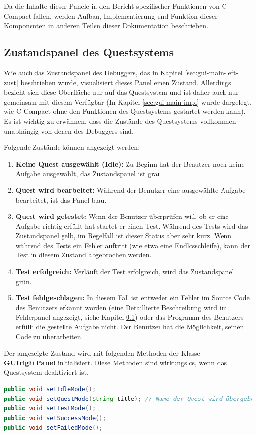 Da die Inhalte dieser Panele in den Bericht spezifischer Funktionen von C Compact fallen, werden Aufbau, Implementierung und Funktion dieser Komponenten in anderen Teilen dieser Dokumentation beschrieben.

\subsection{Zustandspanel des Questsystems}
Wie auch das Zustandspanel des Debuggers, das in Kapitel \ref{sec:gui-main-left-zust} beschrieben wurde, visualisiert dieses Panel einen Zustand. Allerdings bezieht sich diese Oberfläche nur auf das Questsystem und ist daher auch nur gemeinsam mit diesem Verfügbar (In Kapitel \ref{sec:gui-main-impl} wurde dargelegt, wie C Compact ohne den Funktionen des Questsystems gestartet werden kann). Es ist wichtig zu erwähnen, dass die Zustände des Questsystems vollkommen unabhängig von denen des Debuggers sind.

Folgende Zustände können angezeigt werden:
\begin{enumerate}
\item \textbf{Keine Quest ausgewählt (Idle):} Zu Beginn hat der Benutzer noch keine Aufgabe ausgewählt, das Zustandspanel ist grau.
\item \textbf{Quest wird bearbeitet:} Während der Benutzer eine ausgewählte Aufgabe bearbeitet, ist das Panel blau.
\item \textbf{Quest wird getestet:} Wenn der Benutzer überprüfen will, ob er eine Aufgabe richtig erfüllt hat startet er einen Test. Während des Tests wird das Zustandspanel gelb, im Regelfall ist dieser Status aber sehr kurz. Wenn während des Tests ein Fehler auftritt (wie etwa eine Endlosschleife), kann der Test in diesem Zustand abgebrochen werden.
\item \textbf{Test erfolgreich:} Verläuft der Test erfolgreich, wird das Zustandspanel grün.
\item \textbf{Test fehlgeschlagen:} In diesem Fall ist entweder ein Fehler im Source Code des Benutzers erkannt worden (eine Detaillierte Beschreibung wird im Fehlerpanel angezeigt, siehe Kapitel \ref{}) oder das Programm des Benutzers erfüllt die gestellte Aufgabe nicht. Der Benutzer hat die Möglichkeit, seinen Code zu überarbeiten.
\end{enumerate}

Der angezeigte Zustand wird mit folgenden Methoden der Klasse \textbf{GUIrightPanel} initialisiert. Diese Methoden sind wirkungslos, wenn das Questsystem deaktiviert ist.
\begin{lstlisting}[language=JAVA]
public void setIdleMode();
public void setQuestMode(String title); // Name der Quest wird übergeben
public void setTestMode();
public void setSuccessMode();
public void setFailedMode();
\end{lstlisting}

